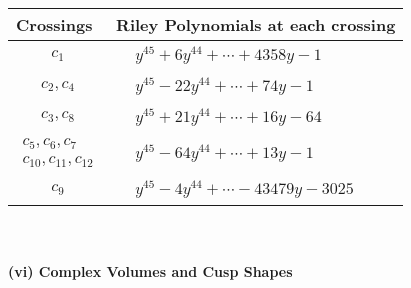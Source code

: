 \documentclass[1p]{elsarticle_modified}
\theoremstyle{definition}
\begin{document}
\begin{tabular}{m{50pt}|m{274pt}}
Crossings & \hspace{64pt}Riley Polynomials at each crossing \\
\hline $$\begin{aligned}c_{1}\end{aligned}$$&$\begin{aligned}
&y^{45}+6 y^{44}+\cdots+4358 y-1
\end{aligned}$\\
\hline $$\begin{aligned}c_{2},c_{4}\end{aligned}$$&$\begin{aligned}
&y^{45}-22 y^{44}+\cdots+74 y-1
\end{aligned}$\\
\hline $$\begin{aligned}c_{3},c_{8}\end{aligned}$$&$\begin{aligned}
&y^{45}+21 y^{44}+\cdots+16 y-64
\end{aligned}$\\
\hline $$\begin{aligned}c_{5},c_{6},c_{7}\\c_{10},c_{11},c_{12}\end{aligned}$$&$\begin{aligned}
&y^{45}-64 y^{44}+\cdots+13 y-1
\end{aligned}$\\
\hline $$\begin{aligned}c_{9}\end{aligned}$$&$\begin{aligned}
&y^{45}-4 y^{44}+\cdots-43479 y-3025
\end{aligned}$\\
\hline
\end{tabular}\\~\\
\newpage\flushleft \textbf{(vi) Complex Volumes and Cusp Shapes}
\end{document}
